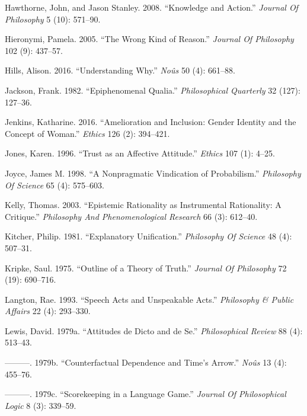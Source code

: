 \documentclass[
  10pt,
  letterpaper,
  DIV=11,
  numbers=noendperiod,
  twoside]{scrartcl}
\newlength{\cslhangindent}
\newenvironment{CSLReferences}[2] %
 {\begin{list}{}{%
  \setlength{\itemindent}{0pt}
  \setlength{\leftmargin}{0pt}
  \setlength{\parsep}{0pt}
  \ifodd #1
   \setlength{\leftmargin}{\cslhangindent}
   \setlength{\itemindent}{-1\cslhangindent}
  \fi
  \setlength{\itemsep}{#2\baselineskip}}}
 {\end{list}}
\begin{document}
\begin{CSLReferences}{1}{0}
Hawthorne, John, and Jason Stanley. 2008. {``Knowledge and Action.''}
\emph{Journal Of Philosophy} 5 (10): 571--90.

Hieronymi, Pamela. 2005. {``The Wrong Kind of Reason.''} \emph{Journal
Of Philosophy} 102 (9): 437--57.

Hills, Alison. 2016. {``Understanding Why.''} \emph{Noûs} 50 (4):
661--88.

Jackson, Frank. 1982. {``Epiphenomenal Qualia.''} \emph{Philosophical
Quarterly} 32 (127): 127--36.

Jenkins, Katharine. 2016. {``Amelioration and Inclusion: Gender Identity
and the Concept of Woman.''} \emph{Ethics} 126 (2): 394--421.

Jones, Karen. 1996. {``Trust as an Affective Attitude.''} \emph{Ethics}
107 (1): 4--25.

Joyce, James M. 1998. {``A Nonpragmatic Vindication of Probabilism.''}
\emph{Philosophy Of Science} 65 (4): 575--603.

Kelly, Thomas. 2003. {``Epistemic Rationality as Instrumental
Rationality: A Critique.''} \emph{Philosophy And Phenomenological
Research} 66 (3): 612--40.

Kitcher, Philip. 1981. {``Explanatory Unification.''} \emph{Philosophy
Of Science} 48 (4): 507--31.

Kripke, Saul. 1975. {``Outline of a Theory of Truth.''} \emph{Journal Of
Philosophy} 72 (19): 690--716.

Langton, Rae. 1993. {``Speech Acts and Unspeakable Acts.''}
\emph{Philosophy \& Public Affairs} 22 (4): 293--330.

Lewis, David. 1979a. {``Attitudes de Dicto and de Se.''}
\emph{Philosophical Review} 88 (4): 513--43.

---------. 1979b. {``Counterfactual Dependence and Time's Arrow.''}
\emph{Noûs} 13 (4): 455--76.

---------. 1979c. {``Scorekeeping in a Language Game.''} \emph{Journal
Of Philosophical Logic} 8 (3): 339--59.


\end{CSLReferences}
\end{document}
